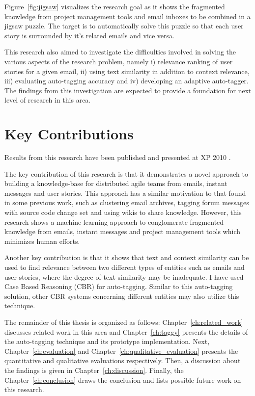 Figure~\ref{fig:jigsaw} visualizes the research goal as it shows the fragmented knowledge from project management tools and email inboxes to be combined in a jigsaw puzzle. The target is to automatically solve this puzzle so that each user story is surrounded by it's related emails and vice versa.

This research also aimed to investigate the difficulties involved in solving the various aspects of the research problem, namely i) relevance ranking of user stories for a given email, ii) using text similarity in addition to context relevance, iii) evaluating auto-tagging accuracy and iv) developing an adaptive auto-tagger. The findings from this investigation are expected to provide a foundation for next level of research in this area.

\section{Key Contributions}
Results from this research have been published and presented at XP 2010 \cite{auto_tagging}. 

The key contribution of this research is that it demonstrates a novel approach to building a knowledge-base for distributed agile teams from emails, instant messages and user stories. This approach has a similar motivation to that found in some previous work, such as clustering email archives\cite{using_hybrid}, tagging forum messages with source code change set\cite{hipikat, hipikat_2} and using wikis to share knowledge. However, this research shows a machine learning approach to conglomerate fragmented knowledge from emails, instant messages and project management tools which minimizes human efforts.
                                  
Another key contribution is that it shows that text and context similarity can be used to find relevance between two different types of entities such as emails and user stories, where the degree of text similarity may be inadequate. I have used Case Based Reasoning (CBR) for auto-tagging. Similar to this auto-tagging solution, other CBR systems concerning different entities may also utilize this technique.

The remainder of this thesis is organized as follows: Chapter~\ref{ch:related_work} discusses related work in this area and Chapter~\ref{ch:taggy} presents the details of the auto-tagging technique and its prototype implementation. Next, Chapter~\ref{ch:evaluation} and Chapter~\ref{ch:qualitative_evaluation} presents the quantitative and qualitative evaluations respectively. Then, a discussion about the findings is given in Chapter~\ref{ch:discussion}. Finally, the Chapter~\ref{ch:conclusion} draws the conclusion and lists possible future work on this research.
